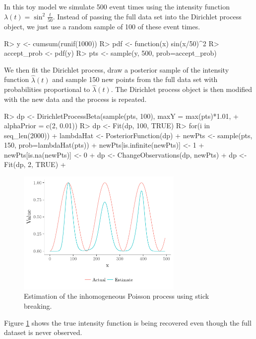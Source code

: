 \documentclass[nojss]{jss}
\begin{document}
In this toy model we simulate 500 event times using the intensity function $\lambda (t) = \sin ^2 \frac{t}{50}$. Instead of passing the full data set into the Dirichlet process object, we just use a random sample of 100 of these event times.

\begin{Schunk}
\begin{Sinput}
R> y <- cumsum(runif(1000))
R> pdf <- function(x) sin(x/50)^2
R> accept_prob <- pdf(y)
R> pts <- sample(y, 500, prob=accept_prob)
\end{Sinput}
\end{Schunk}

We then fit the Dirichlet process, draw a posterior sample of the intensity function $\hat{\lambda} (t)$ and sample 150 new points from the full data set with probabilities proportional to $\hat{\lambda} (t)$. The Dirichlet process object is then modified with the new data and the process is repeated.

\begin{Schunk}
\begin{Sinput}
R> dp <- DirichletProcessBeta(sample(pts, 100), maxY = max(pts)*1.01,
+  alphaPrior = c(2, 0.01))
R> dp <- Fit(dp, 100, TRUE)
R> for(i in seq_len(2000)){
+    lambdaHat <- PosteriorFunction(dp)
+    newPts <- sample(pts, 150, prob=lambdaHat(pts))
+    newPts[is.infinite(newPts)] <- 1
+    newPts[is.na(newPts)] <- 0
+    dp <- ChangeObservations(dp, newPts)
+    dp <- Fit(dp, 2, TRUE)
+  }
\end{Sinput}
\end{Schunk}

\begin{figure}[tb]
\centering
\includegraphics[height=60mm, width=80mm]{img/poissonStickBreaking.pdf}
\caption{Estimation of the inhomogeneous Poisson process using stick breaking.}
\label{fig:poissonStick}
\end{figure}
Figure \ref{fig:poissonStick} shows the true intensity function is being recovered even though the full dataset is never observed.
\end{document}
